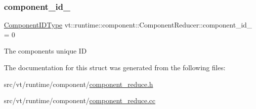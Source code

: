 \subsubsection{\texorpdfstring{component\+\_\+id\+\_\+}{component\_id\_}}
{\footnotesize\ttfamily \hyperlink{namespacevt_ab6ac935c168b809c422d5121da4f2700}{Component\+I\+D\+Type} vt\+::runtime\+::component\+::\+Component\+Reducer\+::component\+\_\+id\+\_\+ = 0\hspace{0.3cm}{\ttfamily [protected]}}

The component\textquotesingle{}s unique ID 

The documentation for this struct was generated from the following files\+:\begin{DoxyCompactItemize}
\item 
src/vt/runtime/component/\hyperlink{component__reduce_8h}{component\+\_\+reduce.\+h}\item 
src/vt/runtime/component/\hyperlink{component__reduce_8cc}{component\+\_\+reduce.\+cc}\end{DoxyCompactItemize}
